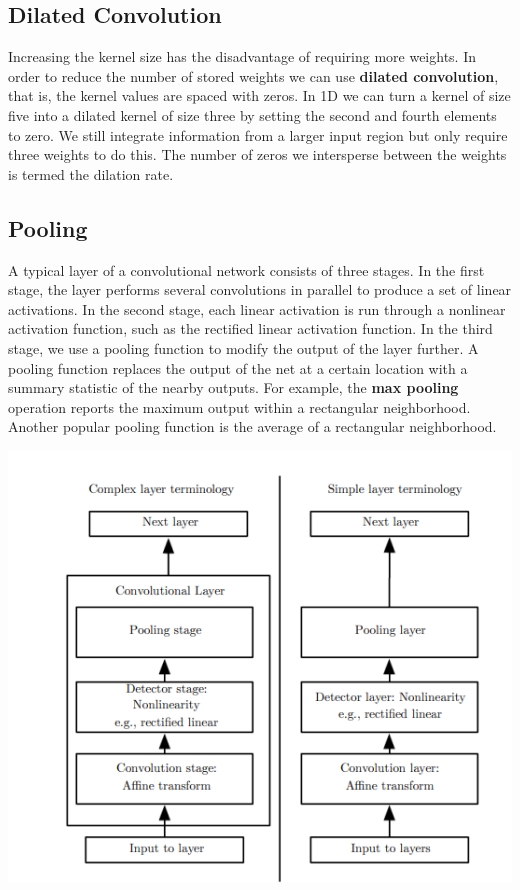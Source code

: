 \subsection{Dilated Convolution}
Increasing the kernel size has the disadvantage of requiring more weights. In order to reduce the number of stored weights we can use \textbf{dilated convolution}, that is, the kernel values are spaced with zeros. In 1D we can turn a kernel of size five into a dilated kernel of size three by setting the second and fourth elements to zero. We still integrate information from a larger input region but only require three weights to do this. The number of zeros we intersperse between the weights is termed the dilation rate.

\subsection{Pooling}
A typical layer of a convolutional network consists of three stages. In the first stage, the layer performs several convolutions in parallel to produce a set of linear activations. In the second stage, each linear activation is run through a nonlinear activation function, such as the rectified linear activation function. In the third stage, we use a pooling function to modify the output of the layer further.\newline\newline
A pooling function replaces the output of the net at a certain location with a summary statistic of the nearby outputs. For example, the \textbf{max pooling} operation reports the maximum output within a rectangular neighborhood. Another popular pooling function is the average of a rectangular neighborhood.
\begin{center}
    \includegraphics[]{images/cnn-structure.png}
\end{center}
